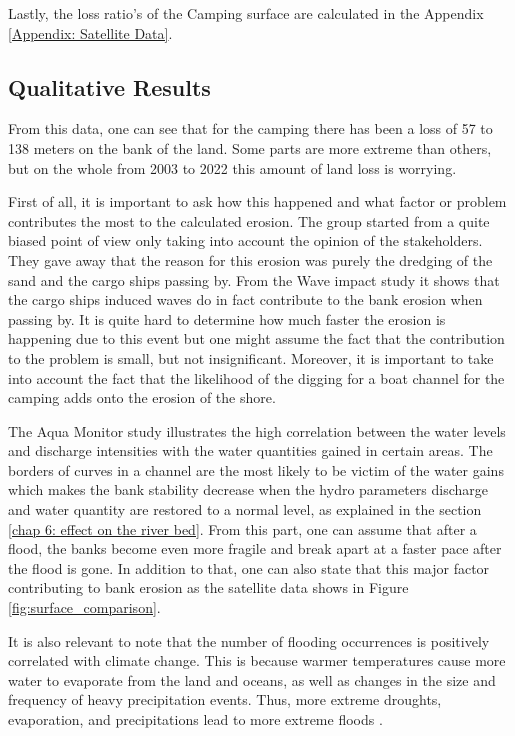 Lastly, the loss ratio's of the Camping surface are calculated in the Appendix \ref{Appendix: Satellite Data}. 

\subsection{Qualitative Results}
From this data, one can see that for the camping there has been a loss of 57 to 138 meters on the bank of the land. Some parts are more extreme than others, but on the whole from 2003 to 2022 this amount of land loss is worrying.

First of all, it is important to ask how this happened and what factor or problem contributes the most to the calculated erosion. The group started from a quite biased point of view only taking into account the opinion of the stakeholders. They gave away that the reason for this erosion was purely the dredging of the sand and the cargo ships passing by. From the Wave impact study it shows that the cargo ships induced waves do in fact contribute to the bank erosion when passing by. It is quite hard to determine how much faster the erosion is happening due to this event but one might assume the fact that the contribution to the problem is small, but not insignificant. Moreover, it is important to take into account the fact that the likelihood of the digging for a boat channel for the camping adds onto the erosion of the shore.

The Aqua Monitor study illustrates the high correlation between the water levels and discharge intensities with the water quantities gained in certain areas. The borders of curves in a channel are the most likely to be victim of the water gains which makes the bank stability decrease when the hydro parameters discharge and water quantity are restored to a normal level, as explained in the section \ref{chap 6: effect on the river bed}. From this part, one can assume that after a flood, the banks become even more fragile and break apart at a faster pace after the flood is gone.
In addition to that, one can also state that this major factor contributing to bank erosion as the satellite data shows in Figure \ref{fig:surface_comparison}.

It is also relevant to note that the number of flooding occurrences is positively correlated with climate change. This is because warmer temperatures cause more water to evaporate from the land and oceans, as well as changes in the size and frequency of heavy precipitation events. Thus, more extreme droughts, evaporation, and precipitations lead to more extreme floods \autocite{usenvironmentalprotectionagencyClimateChangeIndicators2016}.

